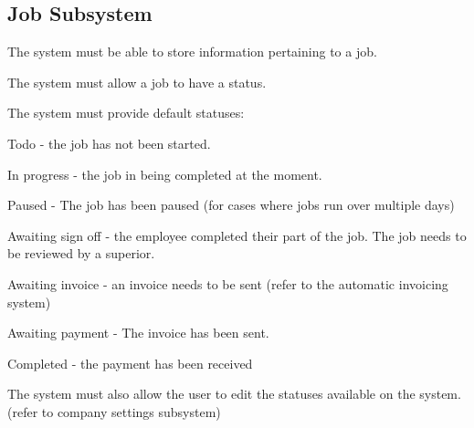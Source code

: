 \documentclass{article}
\begin{document}
	\subsection*{Job Subsystem}	
	\begin{list}{R.}{}
		\item The system must be able to store information pertaining to a job.
		\item The system must allow a job to have a status.
		\item The system must provide default statuses:
		\begin{list}{R.}{}
			\item Todo - the job has not been started.
			\item In progress -  the job in being completed at the moment. 
			\item Paused - The job has been paused (for cases where jobs run over multiple days)
			\item Awaiting sign off - the employee completed their part of the job. The job needs to be reviewed by a superior.
			\item Awaiting invoice - an invoice needs to be sent (refer to the automatic invoicing system)
			\item Awaiting payment - The invoice has been sent.
			\item Completed - the payment has been received
		\end{list}
		\item The system must also allow the user to edit the statuses available on the system. (refer to company settings subsystem) 
	\end{list}
\end{document}
